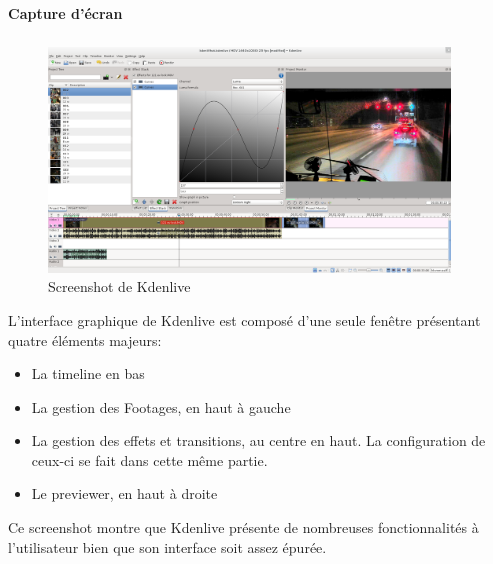 \newpage\paragraph {Capture d'écran}

\subparagraph{}

\begin{figure}[H]

  \begin{center}

    \includegraphics[width=0.95\textwidth]{images/kdenlive}

  \end{center}

  \caption{Screenshot de Kdenlive}

  \label{Yes}

\end{figure}

L'interface graphique de Kdenlive est composé d'une seule fenêtre
présentant quatre éléments majeurs:

\begin{itemize}

  \item {La timeline en bas}

  \item {La gestion des Footages, en haut à gauche}

  \item {La gestion des effets et transitions, au centre en haut. La
  configuration de ceux-ci se fait dans cette même partie.}

  \item {Le previewer, en haut à droite}

\end{itemize}


Ce screenshot montre que Kdenlive présente de nombreuses fonctionnalités
à l'utilisateur bien que son interface soit assez épurée.

